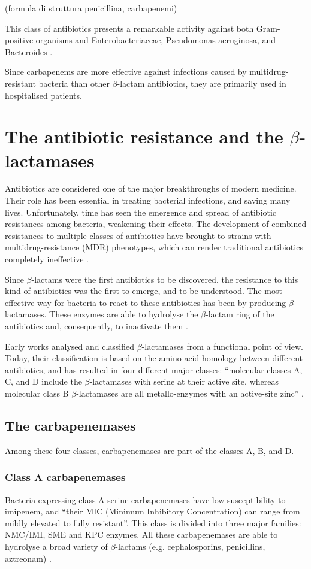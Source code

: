 \documentclass[11pt]{report}
\begin{document}
(formula di struttura penicillina, carbapenemi)

This class of antibiotics presents a remarkable activity against both Gram-positive organisms and Enterobacteriaceae, Pseudomonas aeruginosa, and Bacteroides \cite{Neu1985}.

Since carbapenems are more effective against infections caused by multidrug-resistant bacteria than other $\beta$-lactam antibiotics, they are primarily used in hospitalised patients.

\chapter{The antibiotic resistance and the $\beta$-lactamases}

Antibiotics are considered one of the major breakthroughs of modern medicine.
Their role has been essential in treating bacterial infections, and saving many lives.
Unfortunately, time has seen the emergence and spread of antibiotic resistances among bacteria, weakening their effects.
The development of combined resistances to multiple classes of antibiotics have brought to strains with multidrug-resistance (MDR) phenotypes, which can render traditional antibiotics completely ineffective \cite{Rossolini2014}.

Since $\beta$-lactams were the first antibiotics to be discovered, the resistance to this kind of antibiotics was the first to emerge, and to be understood.
The most effective way for bacteria to react to these antibiotics has been by producing $\beta$-lactamases.
These enzymes are able to hydrolyse the $\beta$-lactam ring of the antibiotics and, consequently, to inactivate them \cite{kong2010beta}.

Early works analysed and classified $\beta$-lactamases from a functional point of view.
Today, their classification is based on the amino acid homology between different antibiotics, and has resulted in four different major classes: “molecular classes A, C, and D include the $\beta$-lactamases with serine at their active site, whereas molecular class B $\beta$-lactamases are all metallo-enzymes with an active-site zinc” \cite{Queenan2007}.

\section{The carbapenemases}
Among these four classes, carbapenemases are part of the classes A, B, and D.

\subsection{Class A carbapenemases}
Bacteria expressing class A serine carbapenemases have low susceptibility to imipenem, and “their MIC (Minimum Inhibitory Concentration) can range from mildly elevated to fully resistant”.
This class is divided into three major families: NMC/IMI, SME and KPC enzymes.
All these carbapenemases are able to hydrolyse a broad variety of $\beta$-lactams (e.g. cephalosporins, penicillins, aztreonam) \cite{kong2010beta} \cite{Queenan2007}.
\end{document}
